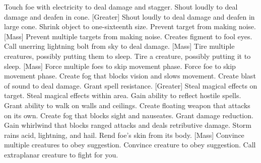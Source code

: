     {Touch foe with electricity to deal damage and stagger.}
    {Shout loudly to deal damage and deafen in cone.}
[Greater]
    {Shout loudly to deal damage and deafen in large cone.}
    {Shrink object to one-sixteenth size.}
    {Prevent target from making noise.}
[Mass]
    {Prevent multiple targets from making noise.}
    {Creates figment to fool eyes.}
    {Call unerring lightning bolt from sky to deal damage.}
[Mass]
    {Tire multiple creatures, possibly putting them to sleep.}
    {Tire a creature, possibly putting it to sleep.}
[Mass]
    {Force multiple foes to skip movement phase.}
    {Force foe to skip movement phase.}
    {Create fog that blocks vision and slows movement.}
    {Create blast of sound to deal damage.}
    {Grant spell resistance.}
[Greater]
    {Steal magical effects on target.}
    {Steal magical effects within area.}
    {Gain ability to reflect hostile spells.}
    {Grant ability to walk on walls and ceilings.}
    {Create floating weapon that attacks on its own.}
    {Create fog that blocks sight and nauseates.}
    {Grant damage reduction.}
    {Gain whirlwind that blocks ranged attacks and deals retributive damage.}
    {Storm rains acid, lightning, and hail.}
    {Rend foe's skin from its body.}
[Mass]
    {Convince multiple creatures to obey suggestion.}
    {Convince creature to obey suggestion.}
    {Call extraplanar creature to fight for you.}
